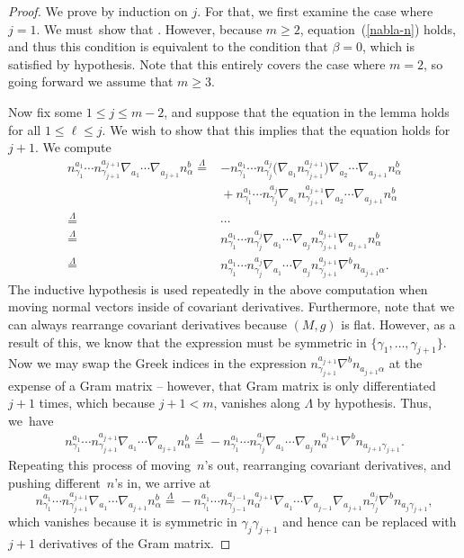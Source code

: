 \documentclass[10pt,a4paper]{article}
\numberwithin{equation}{section}
\renewcommand{\=}{\stackrel \Lambda =}
\begin{document}
\begin{proof}
We prove by induction on $j$. For that, we first examine the case where $j = 1$. We must~show that \smash{$n^a_{\gamma} \nabla_a n^b_{\alpha} \= 0$}. However, because $m \geq 2$, equation~(\ref{nabla-n}) holds, and thus this condition is equivalent to the condition that $\beta = 0$, which is satisfied by hypothesis. Note that this entirely covers the case where $m = 2$, so going forward we assume that $m \geq 3$.

Now fix some $1 \leq j \leq m-2$, and suppose that the equation in the lemma holds for all $1 \leq \ell \leq j$. We wish to show that this implies that the equation holds for $j+1$. We compute
\begin{align*}
n^{a_1}_{\gamma_1} \cdots n^{a_{j+1}}_{\gamma_{j+1}} \nabla_{a_1} \cdots \nabla_{a_{j+1}} n^b_\alpha \=&-n^{a_1}_{\gamma_1} \cdots n^{a_{j}}_{\gamma_{j}} \bigl(\nabla_{a_1} n^{a_{j+1}}_{\gamma_{j+1}}\bigr) \nabla_{a_2} \cdots \nabla_{a_{j+1}} n^b_{\alpha} \\&{}+ n^{a_1}_{\gamma_1} \cdots n^{a_{j}}_{\gamma_{j}} \nabla_{a_1} n^{a_{j+1}}_{\gamma_{j+1}} \nabla_{a_2} \cdots \nabla_{a_{j+1}} n^b_\alpha \\
\={}& \cdots \\
\={}& n^{a_1}_{\gamma_1} \cdots n^{a_{j}}_{\gamma_{j}} \nabla_{a_1} \cdots \nabla_{a_j} n^{a_{j+1}}_{\gamma_{j+1}} \nabla_{a_{j+1}} n^b_{\alpha} \\
\={}& n^{a_1}_{\gamma_1} \cdots n^{a_{j}}_{\gamma_{j}} \nabla_{a_1} \cdots \nabla_{a_j} n^{a_{j+1}}_{\gamma_{j+1}} \nabla^b n_{a_{j+1} \alpha} .
\end{align*}
The inductive hypothesis is used repeatedly in the above computation when moving normal vectors inside of covariant derivatives. Furthermore, note that we can always rearrange covariant derivatives because $(M,g)$ is flat. However, as a result of this, we know that the expression must be symmetric in $\big\{\gamma_1, \ldots, \gamma_{j+1}\big\}$. Now we may swap the Greek indices in the expression $n^{a_{j+1}}_{\gamma_{j+1}} \nabla^b n_{a_{j+1} \alpha}$ at the expense of a Gram matrix -- however, that Gram matrix is only differentiated $j+1$ times, which because $j+1 < m$, vanishes along $\Lambda$ by hypothesis. Thus, we~have
\begin{align*}
n^{a_1}_{\gamma_1} \cdots n^{a_{j+1}}_{\gamma_{j+1}} \nabla_{a_1} \cdots \nabla_{a_{j+1}} n^b_\alpha \= -n^{a_1}_{\gamma_1} \cdots n^{a_{j}}_{\gamma_{j}} \nabla_{a_1} \cdots \nabla_{a_j} n^{a_{j+1}}_{\alpha} \nabla^b n_{a_{j+1} \gamma_{j+1}} .
\end{align*}
Repeating this process of moving~$n$'s out, rearranging covariant derivatives, and pushing different~$n$'s in, we arrive at
\[
n^{a_1}_{\gamma_1} \cdots n^{a_{j+1}}_{\gamma_{j+1}} \nabla_{a_1} \cdots \nabla_{a_{j+1}} n^b_\alpha \= -n^{a_1}_{\gamma_1} \cdots n^{a_{j-1}}_{\gamma_{j-1}} n^{a_{j+1}}_{\alpha} \nabla_{a_1} \cdots \nabla_{a_{j-1}} \nabla_{a_{j+1}} n^{a_{j}}_{\gamma_{j}} \nabla^b n_{a_{j} \gamma_{j+1}} ,
\]
which vanishes because it is symmetric in $\gamma_j \gamma_{j+1}$ and hence can be replaced with $j+1$ derivatives of the Gram matrix.
\end{proof}
\end{document}
